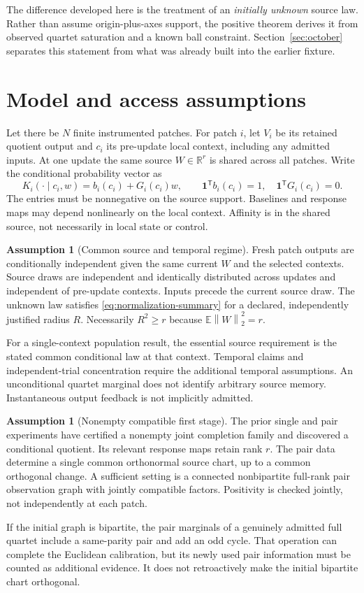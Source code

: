 \documentclass[11pt]{article}
\theoremstyle{definition}
\newtheorem{assumption}[theorem]{Assumption}
\theoremstyle{remark}
\newcommand{\R}{\mathbb R}
\newcommand{\E}{\mathbb E}
\newcommand{\one}{\mathbf 1}
\newcommand{\trans}{\mathsf T}
\newcommand{\norm}[1]{\left\lVert#1\right\rVert}
\begin{document}
The difference developed here is the treatment of an \emph{initially
unknown} source law. Rather than assume origin-plus-axes support, the
positive theorem derives it from observed quartet saturation and a known
ball constraint. Section~\ref{sec:october} separates this statement from
what was already built into the earlier fixture.

\section{Model and access assumptions}
\label{sec:model}

Let there be $N$ finite instrumented patches. For patch $i$, let $V_i$ be
its retained quotient output and $c_i$ its pre-update local context,
including any admitted inputs. At one update the same source $W\in\R^r$
is shared across all patches. Write the conditional probability vector as
\begin{equation}
K_i(\cdot\mid c_i,w)=b_i(c_i)+G_i(c_i)w,
\qquad
\one^\trans b_i(c_i)=1,\quad \one^\trans G_i(c_i)=0.
\label{eq:kernel}
\end{equation}
The entries must be nonnegative on the source support. Baselines and
response maps may depend nonlinearly on the local context. Affinity is in
the shared source, not necessarily in local state or control.

\begin{assumption}[Common source and temporal regime]
\label{ass:source}
Fresh patch outputs are conditionally independent given the same current
$W$ and the selected contexts. Source draws are independent and identically
distributed across updates and independent of pre-update contexts. Inputs
precede the current source draw. The unknown law satisfies
\eqref{eq:normalization-summary} for a declared, independently justified
radius $R$. Necessarily $R^2\ge r$ because $\E\norm{W}_2^2=r$.
\end{assumption}
For a single-context population result, the essential source requirement is
the stated common conditional law at that context. Temporal claims and
independent-trial concentration require the additional temporal assumptions.
An unconditional quartet marginal does not identify arbitrary source
memory. Instantaneous output feedback is not implicitly admitted.

\begin{assumption}[Nonempty compatible first stage]
\label{ass:first}
The prior single and pair experiments have certified a nonempty joint
completion family and discovered a conditional quotient. Its relevant
response maps retain rank $r$. The pair data determine a single common
orthonormal source chart, up to a common orthogonal change. A sufficient
setting is a connected nonbipartite full-rank pair observation graph with
jointly compatible factors. Positivity is checked jointly, not independently
at each patch.
\end{assumption}
If the initial graph is bipartite, the pair marginals of a genuinely admitted
full quartet include a same-parity pair and add an odd cycle. That operation
can complete the Euclidean calibration, but its newly used pair information
must be counted as additional evidence. It does not retroactively make the
initial bipartite chart orthogonal.
\end{document}
